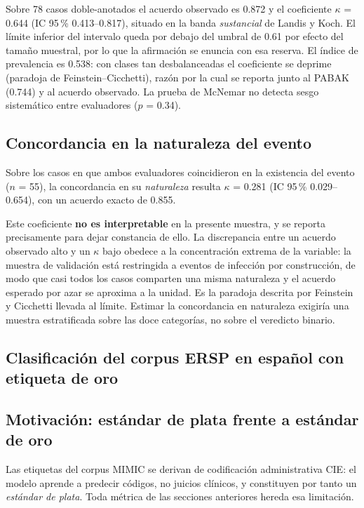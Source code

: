 \documentclass[conference]{IEEEtran}
\begin{document}
Sobre 78 casos doble-anotados el acuerdo observado es
0.872 y el coeficiente $\kappa$ = 0.644
(IC 95\,\% 0.413--0.817), situado en la banda
\emph{sustancial} de Landis y Koch. El límite inferior del intervalo queda por
debajo del umbral de 0.61 por efecto del tamaño muestral, por lo que la
afirmación se enuncia con esa reserva. El índice de prevalencia es
0.538: con clases tan desbalanceadas el coeficiente se
deprime (paradoja de Feinstein--Cicchetti), razón por la cual se reporta junto
al PABAK (0.744) y al acuerdo observado. La prueba de McNemar no
detecta sesgo sistemático entre evaluadores ($p$ = 0.34).

\subsection{Concordancia en la naturaleza del evento}
Sobre los casos en que ambos evaluadores coincidieron en la existencia del
evento ($n$ = 55), la concordancia en su \emph{naturaleza}
resulta $\kappa$ = 0.281
(IC 95\,\% 0.029--0.654),
con un acuerdo exacto de 0.855.

Este coeficiente \textbf{no es interpretable} en la presente muestra, y se
reporta precisamente para dejar constancia de ello. La discrepancia entre un
acuerdo observado alto y un $\kappa$ bajo obedece a la concentración extrema de
la variable: la muestra de validación está restringida a eventos de infección
por construcción, de modo que casi todos los casos comparten una misma
naturaleza y el acuerdo esperado por azar se aproxima a la unidad. Es la
paradoja descrita por Feinstein y Cicchetti \cite{feinstein} llevada al
límite. Estimar la concordancia en naturaleza exigiría una muestra
estratificada sobre las doce categorías, no sobre el veredicto binario.

\subsection{Clasificación del corpus ERSP en español con etiqueta de oro}
\label{sec:ersp}

\subsection{Motivación: estándar de plata frente a estándar de oro}
Las etiquetas del corpus MIMIC se derivan de codificación administrativa CIE:
el modelo aprende a predecir códigos, no juicios clínicos, y constituyen por
tanto un \emph{estándar de plata}. Toda métrica de las secciones anteriores
hereda esa limitación.
\end{document}
